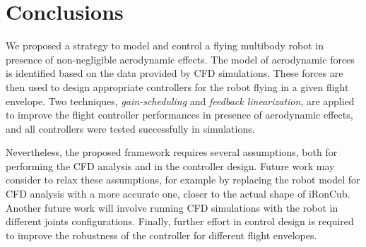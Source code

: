 \section{Conclusions}
\label{conclusion}

We proposed a strategy to model and control a flying multibody robot in presence of non-negligible aerodynamic effects. The model of aerodynamic forces is identified based on the data provided by CFD simulations. These forces are then used to design appropriate controllers for the robot flying in a given flight envelope.
Two techniques, \emph{gain-scheduling} and \emph{feedback linearization}, are applied to improve the flight controller performances in presence of aerodynamic effects, and all controllers were tested successfully in simulations.

Nevertheless, the proposed framework requires several assumptions, both for performing the CFD analysis and in the controller design. Future work may consider to relax these assumptions, for example by replacing the robot model for CFD analysis with a more accurate one, closer to the actual shape of iRonCub. Another future work will involve running CFD simulations with the robot in different joints configurations.
Finally, further effort in control design is required to improve the robustness of the controller for different flight envelopes.


